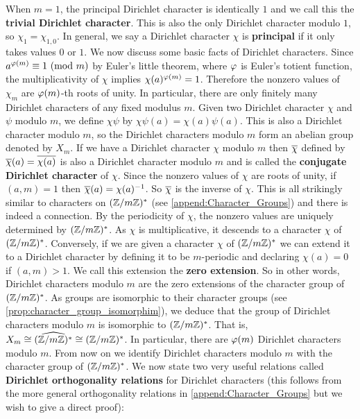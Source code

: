     When $m = 1$, the principal Dirichlet character is identically $1$ and we call this the \textbf{trivial Dirichlet character}. This is also the only Dirichlet character modulo $1$, so $\chi_{1} = \chi_{1,0}$. In general, we say a Dirichlet character $\chi$ is \textbf{principal} if it only takes values $0$ or $1$. We now discuss some basic facts of Dirichlet characters. Since $a^{\varphi(m)} \equiv 1 \ (\mathrm{mod}\text{ }m)$ by Euler's little theorem, where $\varphi$ is Euler's totient function, the multiplicativity of $\chi$ implies $\chi(a)^{\varphi(m)} = 1$. Therefore the nonzero values of $\chi_{m}$ are $\varphi(m)$-th roots of unity. In particular, there are only finitely many Dirichlet characters of any fixed modulus $m$. Given two Dirichlet character $\chi$ and $\psi$ modulo $m$, we define $\chi\psi$ by $\chi\psi(a) = \chi(a)\psi(a)$. This is also a Dirichlet character modulo $m$, so the Dirichlet characters modulo $m$ form an abelian group denoted by $X_{m}$. If we have a Dirichlet character $\chi$ modulo $m$ then $\overline{\chi}$ defined by $\overline{\chi}(a) = \overline{\chi(a)}$ is also a Dirichlet character modulo $m$ and is called the \textbf{conjugate Dirichlet character} of $\chi$. Since the nonzero values of $\chi$ are roots of unity, if $(a,m) = 1$ then $\overline{\chi}(a) = \chi(a)^{-1}$. So $\overline{\chi}$ is the inverse of $\chi$. This is all strikingly similar to characters on $(\mathbb{Z}/m\mathbb{Z})^{\ast}$ (see \cref{append:Character_Groups}) and there is indeed a connection. By the periodicity of $\chi$, the nonzero values are uniquely determined by $(\mathbb{Z}/m\mathbb{Z})^{\ast}$. As $\chi$ is multiplicative, it descends to a character $\chi$ of $(\mathbb{Z}/m\mathbb{Z})^{\ast}$. Conversely, if we are given a character $\chi$ of $(\mathbb{Z}/m\mathbb{Z})^{\ast}$ we can extend it to a Dirichlet character by defining it to be $m$-periodic and declaring $\chi(a) = 0$ if $(a,m) > 1$. We call this extension the \textbf{zero extension}. So in other words, Dirichlet characters modulo $m$ are the zero extensions of the character group of $(\mathbb{Z}/m\mathbb{Z})^{\ast}$. As groups are isomorphic to their character groups (see \cref{prop:character_group_isomorphim}), we deduce that the group of Dirichlet characters modulo $m$ is isomorphic to $(\mathbb{Z}/m\mathbb{Z})^{\ast}$. That is, $X_{m} \cong \widehat{(\mathbb{Z}/m\mathbb{Z})^{\ast}} \cong (\mathbb{Z}/m\mathbb{Z})^{\ast}$. In particular, there are $\varphi(m)$ Dirichlet characters modulo $m$. From now on we identify Dirichlet characters modulo $m$ with the character group of $(\mathbb{Z}/m\mathbb{Z})^{\ast}$. We now state two very useful relations called \textbf{Dirichlet orthogonality relations} for Dirichlet characters (this follows from the more general orthogonality relations in \cref{append:Character_Groups} but we wish to give a direct proof):

